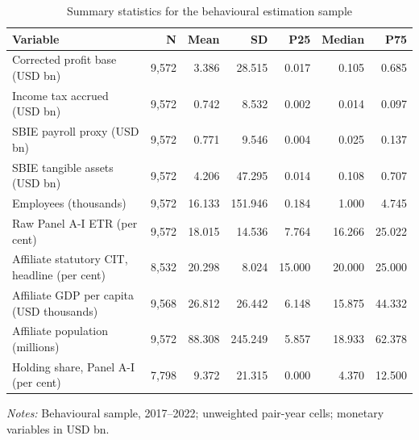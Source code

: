 \begin{table}[H]
\centering
\footnotesize
\setlength{\tabcolsep}{3pt}
\caption{Summary statistics for the behavioural estimation sample}
\label{tab:base_panel_summary_working}
\begin{tabular}{@{}L{5.0cm}rrrrrr@{}}
\toprule
Variable & N & Mean & SD & P25 & Median & P75 \\
\midrule
Corrected profit base (USD bn) & 9,572 & 3.386 & 28.515 & 0.017 & 0.105 & 0.685 \\
Income tax accrued (USD bn) & 9,572 & 0.742 & 8.532 & 0.002 & 0.014 & 0.097 \\
SBIE payroll proxy (USD bn) & 9,572 & 0.771 & 9.546 & 0.004 & 0.025 & 0.137 \\
SBIE tangible assets (USD bn) & 9,572 & 4.206 & 47.295 & 0.014 & 0.108 & 0.707 \\
Employees (thousands) & 9,572 & 16.133 & 151.946 & 0.184 & 1.000 & 4.745 \\
Raw Panel A-I ETR (per cent) & 9,572 & 18.015 & 14.536 & 7.764 & 16.266 & 25.022 \\
Affiliate statutory CIT, headline (per cent) & 8,532 & 20.298 & 8.024 & 15.000 & 20.000 & 25.000 \\
Affiliate GDP per capita (USD thousands) & 9,568 & 26.812 & 26.442 & 6.148 & 15.875 & 44.332 \\
Affiliate population (millions) & 9,572 & 88.308 & 245.249 & 5.857 & 18.933 & 62.378 \\
Holding share, Panel A-I (per cent) & 7,798 & 9.372 & 21.315 & 0.000 & 4.370 & 12.500 \\
\bottomrule
\end{tabular}
\vspace{0.35em}
\noindent\begin{minipage}{\textwidth}
\footnotesize\raggedright\textit{Notes:} Behavioural sample, 2017--2022; unweighted pair-year cells; monetary variables in USD bn.
\end{minipage}
\end{table}

